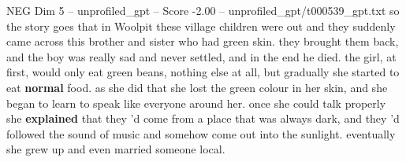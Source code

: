 \begin{textsample}{NEG Dim 5 – unprofiled\_gpt – Score -2.00 – unprofiled\_gpt/t000539\_gpt.txt}  \label{ex:f5_neg_001}
so the story goes that in Woolpit these village children were out and they suddenly came across this brother and sister who had green skin. they brought them back, and the boy was really sad and never settled, and in the end he died. the girl, at first, would only eat green beans, nothing else at all, but gradually she started to eat \textbf{normal} food. as she did that she lost the green colour in her skin, and she began to learn to speak like everyone around her. once she could talk properly she \textbf{explained} that they ’d come from a place that was always dark, and they ’d followed the sound of music and somehow come out into the sunlight. eventually she grew up and even married someone local.

\end{textsample}

